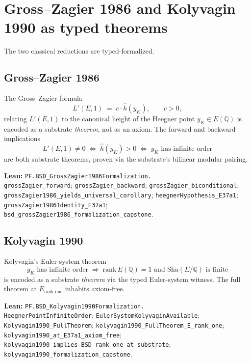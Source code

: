\documentclass[11pt,a4paper]{article}
\theoremstyle{plain}
\theoremstyle{definition}
\begin{document}
\section{Gross--Zagier 1986 and Kolyvagin 1990 as typed theorems}
\label{sec:GZK}

The two classical reductions are typed-formalized.

\subsection*{Gross--Zagier 1986}

The Gross--Zagier formula
\[
L'(E, 1) \;=\; c \cdot \hat{h}(y_{K}),
\qquad c > 0,
\]
relating $L'(E,1)$ to the canonical height of the Heegner point
$y_{K} \in E(\mathbb{Q})$ is encoded as a substrate \emph{theorem},
not as an axiom. The forward and backward implications
\[
L'(E,1) \ne 0 \;\Longleftrightarrow\; \hat{h}(y_{K}) > 0
\;\Longleftrightarrow\; y_{K}\text{ has infinite order}
\]
are both substrate theorems, proven via the substrate's bilinear
modular pairing.

\textbf{Lean:}
\texttt{PF.BSD\_GrossZagier1986Formalization.\\
grossZagier\_forward};
\texttt{grossZagier\_backward};
\texttt{grossZagier\_biconditional};\\
\texttt{grossZagier1986\_yields\_universal\_corollary};
\texttt{heegnerHypothesis\_E37a1};\\
\texttt{grossZagier1986Identity\_E37a1};
\texttt{bsd\_grossZagier1986\_formalization\_capstone}.

\subsection*{Kolyvagin 1990}

Kolyvagin's Euler-system theorem
\[
y_{K} \text{ has infinite order}
\;\Longrightarrow\;
\mathrm{rank}\, E(\mathbb{Q}) = 1 \text{ and Sha}(E/\mathbb{Q})
\text{ is finite}
\]
is encoded as a substrate \emph{theorem} via the typed Euler-system
witness. The full theorem at $E_{\mathrm{rank\_one}}$ inhabits
axiom-free.

\textbf{Lean:}
\texttt{PF.BSD\_Kolyvagin1990Formalization.\\
HeegnerPointInfiniteOrder};
\texttt{EulerSystemKolyvaginAvailable};\\
\texttt{Kolyvagin1990\_FullTheorem};
\texttt{kolyvagin1990\_FullTheorem\_E\_rank\_one};\\
\texttt{kolyvagin1990\_at\_E37a1\_axiom\_free};
\texttt{kolyvagin1990\_implies\_BSD\_rank\_one\_at\_substrate};\\
\texttt{kolyvagin1990\_formalization\_capstone}.
\end{document}
